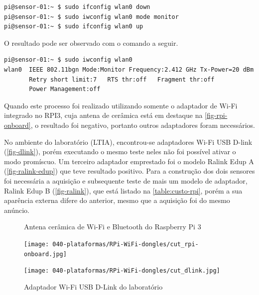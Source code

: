 \begin{lstlisting}[language=bash,caption={Ativação do modo monitor},label=code-iw-monitor]
pi@sensor-01:~ $ sudo ifconfig wlan0 down
pi@sensor-01:~ $ sudo iwconfig wlan0 mode monitor
pi@sensor-01:~ $ sudo ifconfig wlan0 up
\end{lstlisting}

O resultado pode ser observado com o comando a seguir.

\begin{lstlisting}[language=bash,caption={``iwconfig'' com modo monitor},label=code-check-monitor]
pi@sensor-01:~ $ sudo iwconfig wlan0
wlan0  IEEE 802.11bgn Mode:Monitor Frequency:2.412 GHz Tx-Power=20 dBm
	   Retry short limit:7   RTS thr:off   Fragment thr:off
       Power Management:off
\end{lstlisting}

Quando este processo foi realizado utilizando somente o adaptador de Wi-Fi
integrado no RPI3, cuja antena de cerâmica está em destaque na
\autoref{fig-rpi-onboard}, o resultado foi negativo, portanto outros adaptadores
foram necessários.

No ambiente do laboratório (LTIA), encontrou-se adaptadores Wi-Fi USB D-link
(\autoref{fig-dlink}), porém executando o mesmo teste neles não foi possível
ativar o modo promíscuo. Um terceiro adaptador emprestado foi o modelo Ralink
Edup A (\autoref{fig-ralink-edup}) que teve resultado positivo. Para a
construção dos dois sensores foi necessária a aquisição e subsequente teste de
mais um modelo de adaptador, Ralink Edup B (\autoref{fig-ralink}), que está
listado na \autoref{table:custo-rpi}, porém a sua aparência externa difere do
anterior, mesmo que a aquisição foi do mesmo anúncio.

\begin{figure}[htb]
	\centering
	\begin{minipage}{0.49\textwidth}
		\centering
		\caption{Antena cerâmica de Wi-Fi e Bluetooth do Raspberry Pi 3 \label{fig-rpi-onboard}}
		\texttt{[image: 040-plataformas/RPi-WiFi-dongles/cut\_rpi-onboard.jpg]}
	\end{minipage}
	\hfill
	\begin{minipage}{0.49\textwidth}
		\centering
		\caption{Adaptador Wi-Fi USB D-Link do laboratório \label{fig-dlink}}
		\texttt{[image: 040-plataformas/RPi-WiFi-dongles/cut\_dlink.jpg]}
	\end{minipage}
\end{figure}

